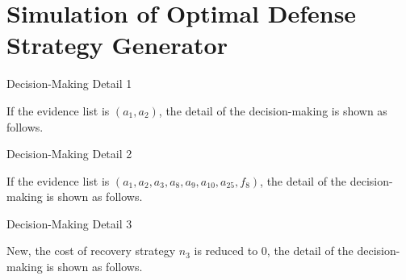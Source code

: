 
\section{Simulation of Optimal Defense Strategy Generator}

\begin{frame}{Decision-Making Detail 1}
  \begin{overlayarea}{\textwidth}{7cm}
  If the evidence list is $(a_1, a_2)$, the detail of the decision-making is shown as follows.\vspace{5pt}
  \begin{center}
    \scalebox{1}{
    
    }
  \end{center}
  \end{overlayarea}
\end{frame}

\begin{frame}{Decision-Making Detail 2}
  \begin{overlayarea}{\textwidth}{7cm}
  If the evidence list is $(a_1, a_2, a_3, a_8, a_9, a_{10}, a_{25}, f_8)$, the detail of the decision-making is shown as follows.
  \begin{center}
    \scalebox{0.7}{
    
    }
  \end{center}
  \end{overlayarea}
\end{frame}

\begin{frame}{Decision-Making Detail 3}
  \begin{overlayarea}{\textwidth}{7cm}
  New, the cost of recovery strategy $n_3$ is reduced to $0$, the detail of the decision-making is shown as follows.
  \begin{center}
    \scalebox{0.7}{
    
    }
  \end{center}
  \end{overlayarea}
\end{frame}